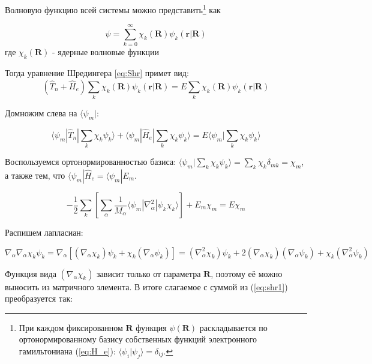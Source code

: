 \documentclass[12pt, oneside]{article}
\numberwithin{equation}{section}  %
\begin{document}
Волновую функцию всей системы можно представить\footnote{При каждом фиксированном \(\bm{R}\) функция \(\psi(\bm{R})\) раскладывается по ортонормированному базису собственных функций электронного гамильтониана (\ref{eq:H_e}): \(\langle \psi_i | \psi_j \rangle = \delta_{ij}\).} как 

\begin{equation}
    \psi = \sum_{k=0}^{\infty} \chi_k (\bm{R}) \psi_k (\bm{r}| \bm{R})
\end{equation}
где \(\chi_k(\bm{R})\) - ядерные волновые функции


Тогда уравнение Шредингера \ref{eq:Shr} примет вид:
\begin{equation}
(\hat{T}_n + \hat{H}_e) \sum_k \chi_k (\bm{R}) \psi_k (\bm{r}| \bm{R}) = E \sum_k \chi_k (\bm{R}) \psi_k (\bm{r}| \bm{R})
\end{equation}

Домножим слева на \(\langle \psi_m|\):

\begin{equation}
\langle \psi_m | \hat{T}_n | \sum_k \chi_k \psi_k \rangle + \langle \psi_m | \hat{H}_e | \sum_k \chi_k \psi_k \rangle = E \langle \psi_m | \sum_k \chi_k \psi_k \rangle
\end{equation}

Воспользуемся ортонормированностью базиса: \(\langle \psi_m | \sum_k \chi_k \psi_k \rangle = \sum_k \chi_k \delta_{mk} = \chi_m\), а также тем, что \(\langle \psi_m | \hat{H}_e = \langle \psi_m | E_m \).

\begin{equation}
- \frac{1}{2} \sum_{k} \left[ \sum_\alpha \frac{1}{M_\alpha} \langle \psi_m |\nabla_\alpha^2 | \psi_k \chi_k \rangle \right]
+ E_m \chi_m = E \chi_m
\label{eq:shr1}
\end{equation}

Распишем лапласиан:

\[\nabla_\alpha \nabla_\alpha \chi_k \psi_k = \nabla_\alpha \left[(\nabla_\alpha \chi_k ) \psi_k + \chi_k (\nabla_\alpha \psi_k)\right] = (\nabla_\alpha^2 \chi_k ) \psi_k + 2 (\nabla_\alpha \chi_k) (\nabla_\alpha \psi_k ) + \chi_k (\nabla_\alpha^2 \psi_k)\]

Функция вида \((\nabla_\alpha \chi_k)\) зависит только от параметра \(\bm{R}\), поэтому её можно выносить из матричного элемента. В итоге слагаемое с суммой из (\ref{eq:shr1}) преобразуется так:
\end{document}
